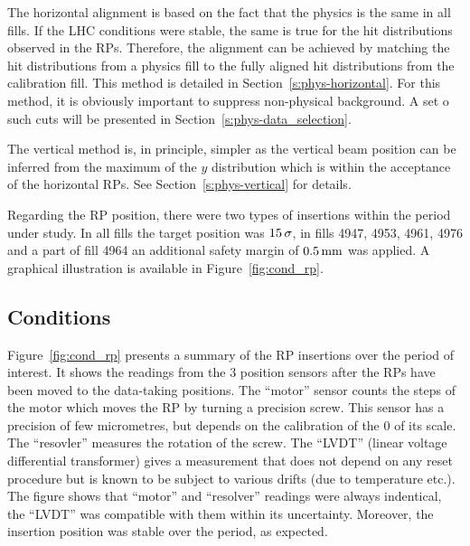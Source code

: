 \documentclass[TOTEM]{cern/cernphprep}
\def\un#1{\,{\rm #1}}
\begin{document}
The horizontal alignment is based on the fact that the physics is the same in all fills. If the LHC conditions were stable, the same is true for the hit distributions observed in the RPs. Therefore, the alignment can be achieved by matching the hit distributions from a physics fill to the fully aligned hit distributions from the calibration fill. This method is detailed in Section~\ref{s:phys-horizontal}. For this method, it is obviously important to suppress non-physical background. A set o such cuts will be presented in Section~\ref{s:phys-data_selection}.

The vertical method is, in principle, simpler as the vertical beam position can be inferred from the maximum of the $y$ distribution which is within the acceptance of the horizontal RPs. See Section~\ref{s:phys-vertical} for details.

Regarding the RP position, there were two types of insertions within the period under study. In all fills the target position was $15\un{\sigma}$, in fills 4947, 4953, 4961, 4976 and a part of fill 4964 an additional safety margin of $0.5\un{mm}$ was applied. A graphical illustration is available in Figure~\ref{fig:cond_rp}.

\subsection{Conditions}
\label{s:phys-conditions}

Figure~\ref{fig:cond_rp} presents a summary of the RP insertions over the period of interest. It shows the readings from the 3 position sensors after the RPs have been moved to the data-taking positions. The ``motor'' sensor counts the steps of the motor which moves the RP by turning a precision screw. This sensor has a precision of few micrometres, but depends on the calibration of the 0 of its scale. The ``resovler'' measures the rotation of the screw. The ``LVDT'' (linear voltage differential transformer) gives a measurement that does not depend on any reset procedure but is known to be subject to various drifts (due to temperature etc.). The figure shows that ``motor'' and ``resolver'' readings were always indentical, the ``LVDT'' was compatible with them within its uncertainty. Moreover, the insertion position was stable over the period, as expected.
\end{document}
